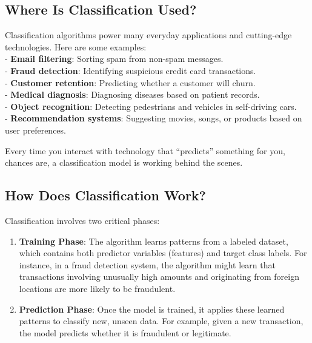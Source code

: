 \documentclass[
]{book}
\providecommand{\tightlist}{%
  \setlength{\itemsep}{0pt}\setlength{\parskip}{0pt}}
\theoremstyle{definition}
\theoremstyle{definition}
\theoremstyle{definition}
\theoremstyle{definition}
\theoremstyle{remark}
\begin{document}
\subsection*{Where Is Classification Used?}\label{where-is-classification-used}

Classification algorithms power many everyday applications and cutting-edge technologies. Here are some examples:\\
- \textbf{Email filtering}: Sorting spam from non-spam messages.\\
- \textbf{Fraud detection}: Identifying suspicious credit card transactions.\\
- \textbf{Customer retention}: Predicting whether a customer will churn.\\
- \textbf{Medical diagnosis}: Diagnosing diseases based on patient records.\\
- \textbf{Object recognition}: Detecting pedestrians and vehicles in self-driving cars.\\
- \textbf{Recommendation systems}: Suggesting movies, songs, or products based on user preferences.

Every time you interact with technology that ``predicts'' something for you, chances are, a classification model is working behind the scenes.

\subsection*{How Does Classification Work?}\label{how-does-classification-work}

Classification involves two critical phases:

\begin{enumerate}
\def\labelenumi{\arabic{enumi}.}
\tightlist
\item
  \textbf{Training Phase}: The algorithm learns patterns from a labeled dataset, which contains both predictor variables (features) and target class labels. For instance, in a fraud detection system, the algorithm might learn that transactions involving unusually high amounts and originating from foreign locations are more likely to be fraudulent.\\
\item
  \textbf{Prediction Phase}: Once the model is trained, it applies these learned patterns to classify new, unseen data. For example, given a new transaction, the model predicts whether it is fraudulent or legitimate.
\end{enumerate}
\end{document}
